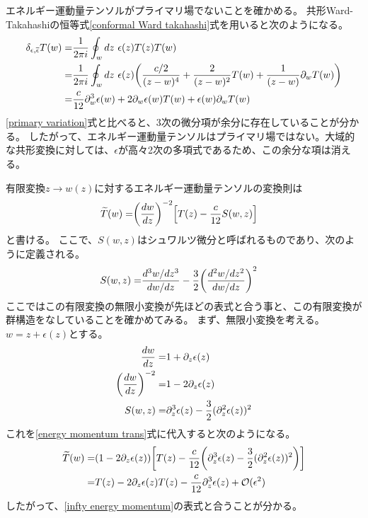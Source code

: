 \documentclass[11pt, dvipdfmx]{article}
\numberwithin{equation}{section}
\newcommand{\blankline}{\par\vspace{\baselineskip}} %
\begin{document}
エネルギー運動量テンソルがプライマリ場でないことを確かめる。
共形Ward-Takahashiの恒等式\eqref{conformal Ward takahashi}式を用いると次のようになる。
\begin{align}
    \delta_{\epsilon,\overline{\epsilon}} T(w)=&\frac{1}{2\pi i}\oint_{w} dz \ \epsilon(z) T(z)T(w)\\
    =&\frac{1}{2\pi i}\oint_{w} dz \ \epsilon(z)\qty(\frac{c/2}{(z-w)^4} + \frac{2}{(z-w)^2}T(w) + \frac{1}{(z-w)}\partial_w T(w))\\
    =&\frac{c}{12}\partial_w^3 \epsilon(w) + 2 \partial_w \epsilon(w) T(w) + \epsilon(w)\partial_w T(w)\label{infty energy momentum}
\end{align}
\eqref{primary variation}式と比べると、3次の微分項が余分に存在していることが分かる。
したがって、エネルギー運動量テンソルはプライマリ場ではない。大域的な共形変換に対しては、$\epsilon$が高々2次の多項式であるため、この余分な項は消える。
\blankline
有限変換$z\rightarrow w(z)$に対するエネルギー運動量テンソルの変換則は
\begin{align}
    \widetilde{T}(w)=&\qty(\frac{dw}{dz})^{-2}\qty[T(z) - \frac{c}{12}S(w,z)]\label{energy momentum trans}
\end{align}
と書ける。
ここで、$S(w,z)$はシュワルツ微分と呼ばれるものであり、次のように定義される。
\begin{align}
    S(w,z)=&\frac{d^3 w/dz^3}{dw/dz} - \frac{3}{2}\qty(\frac{d^2 w/dz^2}{dw/dz})^2
\end{align}
ここではこの有限変換の無限小変換が先ほどの表式と合う事と、この有限変換が群構造をなしていることを確かめてみる。
まず、無限小変換を考える。$w=z+\epsilon(z)$とする。
\begin{align}
    \frac{dw}{dz}=&1+\partial_z \epsilon(z)\\
    \qty(\frac{dw}{dz})^{-2}=&1 - 2\partial_z \epsilon(z)\\
    S(w,z)=& \partial_z^3 \epsilon(z)-\frac{3}{2}(\partial_z^2 \epsilon(z))^2
\end{align}
これを\eqref{energy momentum trans}式に代入すると次のようになる。
\begin{align}
    \widetilde{T}(w)=&\qty(1 - 2\partial_z \epsilon(z))\qty[T(z) - \frac{c}{12}\qty(\partial_z^3 \epsilon(z)-\frac{3}{2}(\partial_z^2 \epsilon(z))^2)]\\
    =&T(z) - 2\partial_z \epsilon(z) T(z) - \frac{c}{12}\partial_z^3 \epsilon(z) + \mathcal{O}(\epsilon^2)
\end{align}
したがって、\eqref{infty energy momentum}の表式と合うことが分かる。
\blankline
\end{document}
